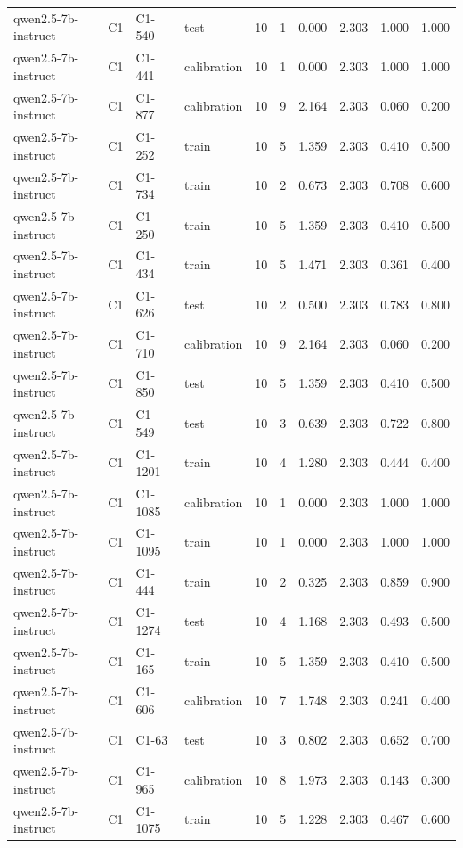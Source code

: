 \begin{table}
\begin{tabular}{llllrrrrrr}
qwen2.5-7b-instruct & C1 & C1-540 & test & 10 & 1 & 0.000 & 2.303 & 1.000 & 1.000 \\
qwen2.5-7b-instruct & C1 & C1-441 & calibration & 10 & 1 & 0.000 & 2.303 & 1.000 & 1.000 \\
qwen2.5-7b-instruct & C1 & C1-877 & calibration & 10 & 9 & 2.164 & 2.303 & 0.060 & 0.200 \\
qwen2.5-7b-instruct & C1 & C1-252 & train & 10 & 5 & 1.359 & 2.303 & 0.410 & 0.500 \\
qwen2.5-7b-instruct & C1 & C1-734 & train & 10 & 2 & 0.673 & 2.303 & 0.708 & 0.600 \\
qwen2.5-7b-instruct & C1 & C1-250 & train & 10 & 5 & 1.359 & 2.303 & 0.410 & 0.500 \\
qwen2.5-7b-instruct & C1 & C1-434 & train & 10 & 5 & 1.471 & 2.303 & 0.361 & 0.400 \\
qwen2.5-7b-instruct & C1 & C1-626 & test & 10 & 2 & 0.500 & 2.303 & 0.783 & 0.800 \\
qwen2.5-7b-instruct & C1 & C1-710 & calibration & 10 & 9 & 2.164 & 2.303 & 0.060 & 0.200 \\
qwen2.5-7b-instruct & C1 & C1-850 & test & 10 & 5 & 1.359 & 2.303 & 0.410 & 0.500 \\
qwen2.5-7b-instruct & C1 & C1-549 & test & 10 & 3 & 0.639 & 2.303 & 0.722 & 0.800 \\
qwen2.5-7b-instruct & C1 & C1-1201 & train & 10 & 4 & 1.280 & 2.303 & 0.444 & 0.400 \\
qwen2.5-7b-instruct & C1 & C1-1085 & calibration & 10 & 1 & 0.000 & 2.303 & 1.000 & 1.000 \\
qwen2.5-7b-instruct & C1 & C1-1095 & train & 10 & 1 & 0.000 & 2.303 & 1.000 & 1.000 \\
qwen2.5-7b-instruct & C1 & C1-444 & train & 10 & 2 & 0.325 & 2.303 & 0.859 & 0.900 \\
qwen2.5-7b-instruct & C1 & C1-1274 & test & 10 & 4 & 1.168 & 2.303 & 0.493 & 0.500 \\
qwen2.5-7b-instruct & C1 & C1-165 & train & 10 & 5 & 1.359 & 2.303 & 0.410 & 0.500 \\
qwen2.5-7b-instruct & C1 & C1-606 & calibration & 10 & 7 & 1.748 & 2.303 & 0.241 & 0.400 \\
qwen2.5-7b-instruct & C1 & C1-63 & test & 10 & 3 & 0.802 & 2.303 & 0.652 & 0.700 \\
qwen2.5-7b-instruct & C1 & C1-965 & calibration & 10 & 8 & 1.973 & 2.303 & 0.143 & 0.300 \\
qwen2.5-7b-instruct & C1 & C1-1075 & train & 10 & 5 & 1.228 & 2.303 & 0.467 & 0.600 \\

\end{tabular}
\end{table}
